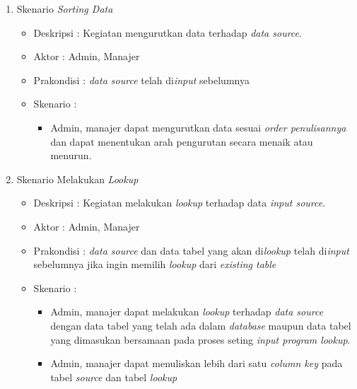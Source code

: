 \begin{enumerate}
		\item Skenario \textit{Sorting Data}
		{\renewcommand\labelitemi{}
		\begin{itemize}
			\item Deskripsi		: Kegiatan mengurutkan data terhadap \textit{data source}.
			\item Aktor				: Admin, Manajer 
			\item Prakondisi	: \textit{data source} telah di\textit{input} sebelumnya
			\item Skenario		:
				\begin{itemize}
					\item Admin, manajer dapat mengurutkan data sesuai \textit{order penulisannya} dan dapat menentukan arah pengurutan secara menaik atau menurun.
				\end{itemize}
		\end{itemize}
		}
		
			\item Skenario Melakukan \textit{Lookup}
		{\renewcommand\labelitemi{}
		\begin{itemize}
			\item Deskripsi		: Kegiatan melakukan \textit{lookup} terhadap data \textit{input source}.
			\item Aktor				: Admin, Manajer 
			\item Prakondisi	: \textit{data source} dan data tabel yang akan di\textit{lookup} telah di\textit{input} sebelumnya jika ingin memilih \textit{lookup} dari \textit{existing table}
			\item Skenario		:
				\begin{itemize}
					\item Admin, manajer dapat melakukan \textit{lookup} terhadap \textit{data source} dengan data tabel yang telah ada dalam \textit{database} maupun data tabel yang dimasukan bersamaan pada proses seting \textit{input program lookup}.
					\item Admin, manajer dapat menuliskan lebih dari satu \textit{column key} pada tabel \textit{source} dan tabel \textit{lookup} 
				\end{itemize}
		\end{itemize}
		}
		

\end{enumerate}
